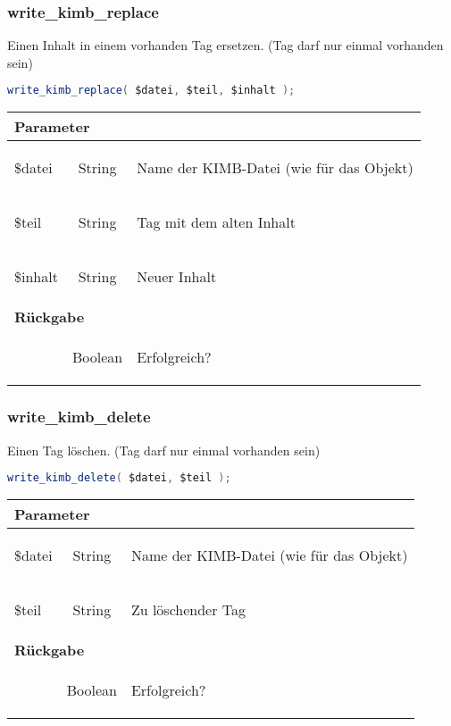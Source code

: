 \documentclass[paper=A4,pagesize=auto,12pt,headinclude=true,footinclude=true,BCOR=0mm,DIV=calc]{scrartcl}
\begin{document}
  \subsubsection{write\_kimb\_replace}
	    Einen Inhalt in einem vorhanden Tag ersetzen. (Tag darf nur einmal vorhanden sein)
	    \begin{lstlisting}[gobble=4,language=Java]
	      write_kimb_replace( $datei, $teil, $inhalt );
	    \end{lstlisting}
	    
	    \begin{tabular}{|lcp{}|}
		    \hline
		      \multicolumn{3}{|l|}{ \textbf{Parameter} } \\
		    \hline
		      \$datei & String & \begin{itshape} Name der KIMB-Datei (wie für das Objekt)\end{itshape} \\
		      \$teil & String & \begin{itshape} Tag mit dem alten Inhalt \end{itshape} \\
		      \$inhalt & String & \begin{itshape} Neuer Inhalt \end{itshape} \\
		    \hline
		      \multicolumn{3}{|l|}{ \textbf{Rückgabe} } \\
		    \hline
			     & Boolean & \begin{itshape} Erfolgreich? \end{itshape} \\
		    \hline
	    \end{tabular}
	    
  \subsubsection{write\_kimb\_delete}
	    Einen Tag löschen. (Tag darf nur einmal vorhanden sein)
	    \begin{lstlisting}[gobble=4,language=Java]
	      write_kimb_delete( $datei, $teil );
	    \end{lstlisting}
	    
	    \begin{tabular}{|lcp{}|}
		    \hline
		      \multicolumn{3}{|l|}{ \textbf{Parameter} } \\
		    \hline
		      \$datei & String & \begin{itshape} Name der KIMB-Datei (wie für das Objekt)\end{itshape} \\
		      \$teil & String & \begin{itshape} Zu löschender Tag \end{itshape} \\
		    \hline
		      \multicolumn{3}{|l|}{ \textbf{Rückgabe} } \\
		    \hline
			     & Boolean & \begin{itshape} Erfolgreich? \end{itshape} \\
		    \hline
	    \end{tabular}
  
\end{document}
